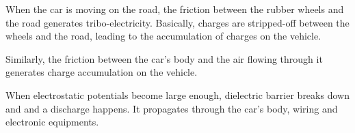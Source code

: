 When the car is moving on the road, the friction between the rubber wheels and the road generates tribo-electricity.
Basically, charges are stripped-off between the wheels and the road, leading to the accumulation of charges on the vehicle.

Similarly, the friction between the car's body and the air flowing through it generates charge accumulation on the vehicle.

When electrostatic potentials become large enough, dielectric barrier breaks down and and a discharge happens.
It propagates through the car's body, wiring and electronic equipments.
